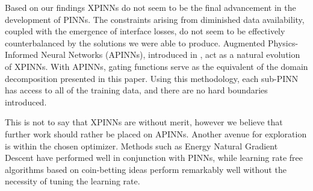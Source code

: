 Based on our findings XPINNs do not seem to be the final advancement in the development of PINNs.
The constraints arising from diminished data availability, coupled with the emergence of interface losses, do not seem to be effectively counterbalanced by the solutions we were able to produce.
Augmented Physics-Informed Neural Networks (APINNs), introduced in \textcite{Hu_2023}, act as a natural evolution of XPINNs.
With APINNs, gating functions serve as the equivalent of the domain decomposition presented in this paper.
Using this methodology, each sub-PINN has access to all of the training data, and there are no hard boundaries introduced.

This is not to say that XPINNs are without merit, however we believe that further work should rather be placed on APINNs.
Another avenue for exploration is within the chosen optimizer.
Methods such as Energy Natural Gradient Descent \cite{müller2023achieving} have performed well in conjunction with PINNs, while learning rate free algorithms based on coin-betting ideas \cite{sharrock2023learning} perform remarkably well without the necessity of tuning the learning rate.
